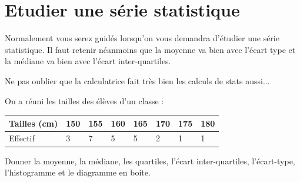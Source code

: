 \section{Etudier une série statistique}
Normalement vous serez guidés lorsqu'on vous demandra d'étudier une série statistique. Il faut retenir néanmoins que la moyenne va bien avec l'écart type et la médiane va bien avec l'écart inter-quartiles.\newline

Ne pas oublier que la calculatrice fait très bien les calculs de stats aussi...\newline

\begin{exemple}
On a réuni les tailles des élèves d'un classe : \newline


\begin{tabularx}{\linewidth}{|X|X|X|X|X|X|X|X|}
\hline
Tailles (cm) & 150 & 155 & 160 & 165 & 170 & 175 & 180\\ \hline
Effectif & 3 & 7 & 5 & 5 & 2 & 1&1\\ \hline
\end{tabularx}
\vspace{\baselineskip}
Donner la moyenne, la médiane, les quartiles, l'écart inter-quartiles, l'écart-type, l'histogramme et le diagramme en boite.\newline


\end{exemple}
